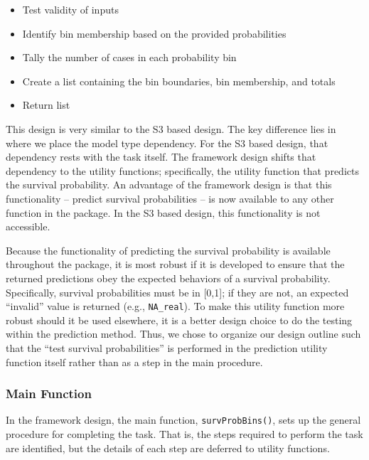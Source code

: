 \documentclass[
]{book}
\providecommand{\tightlist}{%
  \setlength{\itemsep}{0pt}\setlength{\parskip}{0pt}}
\begin{document}
\begin{itemize}
\begin{itemize}
    \begin{itemize}
    \tightlist
    \item
      Test validity of inputs
    \item
      Identify bin membership based on the provided probabilities
    \item
      Tally the number of cases in each probability bin
    \item
      Create a list containing the bin boundaries, bin membership, and totals
    \item
      Return list
    \end{itemize}
  \end{itemize}
\end{itemize}

This design is very similar to the S3 based design. The key difference lies in where we place the model type dependency. For the S3 based design, that dependency rests with the task itself. The framework design shifts that dependency to the utility functions; specifically, the utility function that predicts the survival probability. An advantage of the framework design is that this functionality -- predict survival probabilities -- is now available to any other function in the package. In the S3 based design, this functionality is not accessible.

Because the functionality of predicting the survival probability is available throughout the package, it is most robust if it is developed to ensure that the returned predictions obey the expected behaviors of a survival probability. Specifically, survival probabilities must be in {[}0,1{]}; if they are not, an expected ``invalid'' value is returned (e.g., \texttt{NA\_real}). To make this utility function more robust should it be used elsewhere, it is a better design choice to do the testing within the prediction method. Thus, we chose to organize our design outline such that the ``test survival probabilities'' is performed in the prediction utility function itself rather than as a step in the main procedure.

\hypertarget{main-function}{%
\subsubsection{Main Function}\label{main-function}}

In the framework design, the main function, \texttt{survProbBins()}, sets up the general procedure for completing the task. That is, the steps required to perform the task are identified, but the details of each step are deferred to utility functions.
\end{document}
